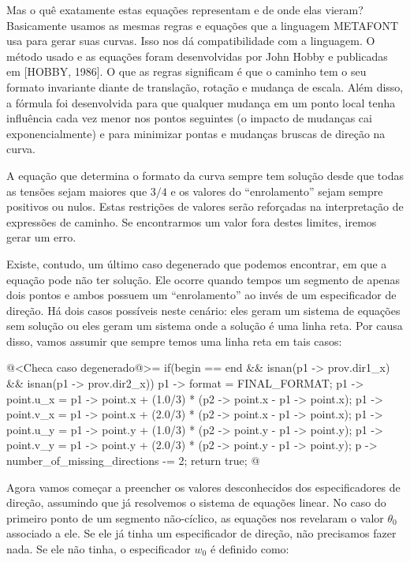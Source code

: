 Mas o quê exatamente estas equações representam e de onde elas vieram?
Basicamente usamos as mesmas regras e equações que a linguagem
METAFONT usa para gerar suas curvas. Isso nos dá compatibilidade com a
linguagem. O método usado e as equações foram desenvolvidas por John
Hobby e publicadas em [HOBBY, 1986]. O que as regras
significam é que o caminho tem o seu formato invariante diante de
translação, rotação e mudança de escala. Além disso, a fórmula foi
desenvolvida para que qualquer mudança em um ponto local tenha
influência cada vez menor nos pontos seguintes (o impacto de mudanças
cai exponencialmente) e para minimizar pontas e mudanças bruscas de
direção na curva.

A equação que determina o formato da curva sempre tem solução desde
que todas as tensões sejam maiores que $3/4$ e os valores do
``enrolamento'' sejam sempre positivos ou nulos. Estas restrições de
valores serão reforçadas na interpretação de expressões de caminho. Se
encontrarmos um valor fora destes limites, iremos gerar um erro.

Existe, contudo, um último caso degenerado que podemos encontrar, em
que a equação pode não ter solução. Ele ocorre quando tempos um
segmento de apenas dois pontos e ambos possuem um ``enrolamento'' ao
invés de um especificador de direção. Há dois casos possíveis neste
cenário: eles geram um sistema de equações sem solução ou eles geram
um sistema onde a solução é uma linha reta. Por causa disso, vamos
assumir que sempre temos uma linha reta em tais casos:

\iniciocodigo
@<Checa caso degenerado@>=
if(begin == end && isnan(p1 -> prov.dir1_x) && isnan(p1 -> prov.dir2_x)){
  p1 -> format = FINAL_FORMAT;
  p1 -> point.u_x = p1 -> point.x + (1.0/3) * (p2 -> point.x - p1 -> point.x);
  p1 -> point.v_x = p1 -> point.x + (2.0/3) * (p2 -> point.x - p1 -> point.x);
  p1 -> point.u_y = p1 -> point.y + (1.0/3) * (p2 -> point.y - p1 -> point.y);
  p1 -> point.v_y = p1 -> point.y + (2.0/3) * (p2 -> point.y - p1 -> point.y);
  p -> number_of_missing_directions -= 2;
  return true;
}
@
\fimcodigo

Agora vamos começar a preencher os valores desconhecidos dos
especificadores de direção, assumindo que já resolvemos o sistema de
equações linear. No caso do primeiro ponto de um segmento não-cíclico,
as equações nos revelaram o valor $\theta_0$ associado a ele. Se ele
já tinha um especificador de direção, não precisamos fazer nada. Se
ele não tinha, o especificador $w_0$ é definido como:


